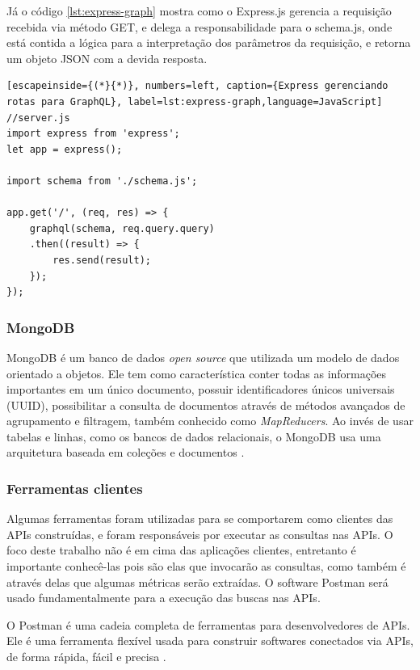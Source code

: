 Já o código \ref{lst:express-graph} mostra como o Express.js gerencia a requisição recebida via método GET, e delega a responsabilidade para o \textup{schema.js}, onde está contida a lógica para a interpretação dos parâmetros da requisição, e retorna um objeto JSON com a devida resposta.

\begin{lstlisting}[escapeinside={(*}{*)}, numbers=left, caption={Express gerenciando rotas para GraphQL}, label=lst:express-graph,language=JavaScript]
//server.js
import express from 'express';
let app = express();

import schema from './schema.js';

app.get('/', (req, res) => {
    graphql(schema, req.query.query)
    .then((result) => {
        res.send(result);
    });
});

\end{lstlisting}

\subsubsection*{MongoDB}

MongoDB é um banco de dados \textit{open source} que utilizada um modelo de dados orientado a objetos. Ele tem como característica conter todas as informações importantes em um único documento, possuir identificadores únicos universais (UUID), possibilitar a consulta de documentos através de métodos avançados de agrupamento e filtragem, também conhecido como \textit{MapReducers}. Ao invés de usar tabelas e linhas, como os bancos de dados relacionais, o MongoDB usa uma arquitetura baseada em coleções e documentos \cite{mongo}.


\subsubsection*{Ferramentas clientes}

Algumas ferramentas foram utilizadas para se comportarem como clientes das APIs construídas, e foram responsáveis por executar as consultas nas APIs. O foco deste trabalho não é em cima das aplicações clientes, entretanto é importante conhecê-las pois são elas que invocarão as consultas, como também é através delas que algumas métricas serão extraídas. O software Postman será usado fundamentalmente para a execução das buscas nas APIs.

O Postman é uma cadeia completa de ferramentas para desenvolvedores de APIs. Ele é uma ferramenta flexível usada para construir softwares conectados via APIs, de forma rápida, fácil e precisa \cite{postman}.

